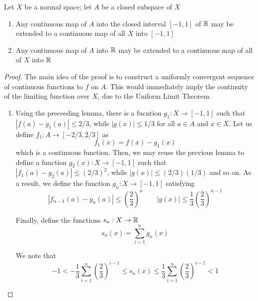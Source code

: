 \begin{theorem}
    Let $X$ be a normal space; let $A$ be a closed subspace of $X$ 
    \begin{enumerate}
        \item Any continuous map of $A$ into the closed interval $[-1,1]$ of $\mathbb{R}$ may be extended to a continuous map of all $X$ into $[-1,1]$
        \item Any continuous map of $A$ into $\mathbb{R}$ may be extended to a continuous map of all of $X$ into $\mathbb{R}$
    \end{enumerate}
\end{theorem}
\begin{proof}
    The main idea of the proof is to construct a uniformly convergent sequence of continuous functions to $f$ on $A$. This would immediately imply the continuity of the limiting function over $X$, due to the Uniform Limit Theorem.

    \begin{enumerate}
        \item Using the preceeding lemma, there is a fucntion $g_1: X\to[-1,1]$ such that $|f(a) - g_1(a)|\le 2/3$, while $|g(x)|\le 1/3$ for all $a\in A$ and $x\in X$. Let us define $f_1: A\to[-2/3,2/3]$ as 
        \begin{equation*}
            f_1(x) = f(x) - g_1(x)
        \end{equation*}
        which is a continuous function. Then, we may reuse the previous lemma to define a function $g_2(x): X\to[-1,1]$ such that $|f_1(a) - g_2(a)|\le(2/3)^2$, while $|g(x)|\le(2/3)(1/3)$ and so on. As a result, we define the function $g_n:X\to[-1,1]$ satisfying 
        \begin{equation*}
            |f_{n - 1}(a) - g_n(a)|\le\left(\frac{2}{3}\right)^n\qquad|g(x)|\le\frac{1}{3}\left(\frac{2}{3}\right)^{n - 1}
        \end{equation*}

        Finally, define the functions $s_n:X\to\mathbb{R}$
        \begin{equation*}
            s_n(x) = \sum_{i = 1}^ng_n(x)
        \end{equation*}

        We note that 
        \begin{equation*}
            -1 < -\frac{1}{3}\sum_{i = 1}^{n}\left(\frac{2}{3}\right)^{i - 1}\le s_n(x)\le \frac{1}{3}\sum_{i = 1}^{n}\left(\frac{2}{3}\right)^{i - 1} < 1
        \end{equation*}


\end{enumerate}
\end{proof}
